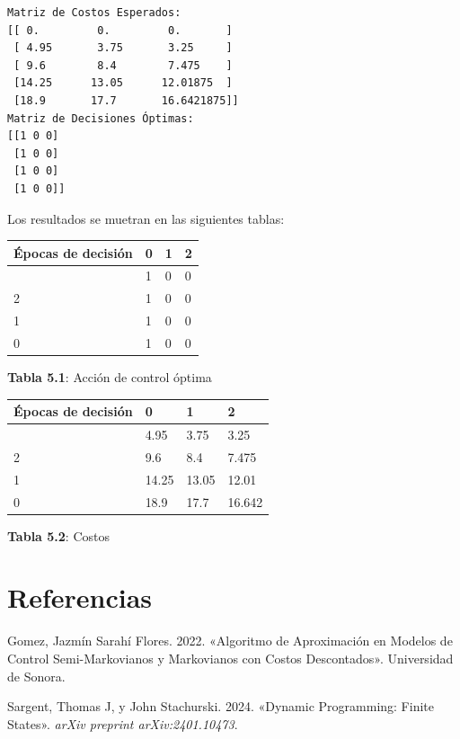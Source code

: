 \documentclass[
  us-letterpaper,
  DIV=11,
  numbers=noendperiod]{scrreprt}
\newlength{\cslhangindent}
\newenvironment{CSLReferences}[2] %
 {\begin{list}{}{%
  \setlength{\itemindent}{0pt}
  \setlength{\leftmargin}{0pt}
  \setlength{\parsep}{0pt}
  \ifodd #1
   \setlength{\leftmargin}{\cslhangindent}
   \setlength{\itemindent}{-1\cslhangindent}
  \fi
  \setlength{\itemsep}{#2\baselineskip}}}
 {\end{list}}
\begin{document}
\begin{verbatim}
Matriz de Costos Esperados:
[[ 0.         0.         0.       ]
 [ 4.95       3.75       3.25     ]
 [ 9.6        8.4        7.475    ]
 [14.25      13.05      12.01875  ]
 [18.9       17.7       16.6421875]]
Matriz de Decisiones Óptimas:
[[1 0 0]
 [1 0 0]
 [1 0 0]
 [1 0 0]]
\end{verbatim}

Los resultados se muetran en las siguientes tablas:

\begin{longtable}[]{@{}llll@{}}
\toprule\noalign{}
\textbf{Épocas de decisión} & \textbf{0} & \textbf{1} & \textbf{2} \\
\midrule\noalign{}
\endhead
\bottomrule\noalign{}
\endlastfoot
3 & 1 & 0 & 0 \\
2 & 1 & 0 & 0 \\
1 & 1 & 0 & 0 \\
0 & 1 & 0 & 0 \\
\end{longtable}

\textbf{Tabla 5.1}: Acción de control óptima

\begin{longtable}[]{@{}llll@{}}
\toprule\noalign{}
\textbf{Épocas de decisión} & \textbf{0} & \textbf{1} & \textbf{2} \\
\midrule\noalign{}
\endhead
\bottomrule\noalign{}
\endlastfoot
3 & 4.95 & 3.75 & 3.25 \\
2 & 9.6 & 8.4 & 7.475 \\
1 & 14.25 & 13.05 & 12.01 \\
0 & 18.9 & 17.7 & 16.642 \\
\end{longtable}

\textbf{Tabla 5.2}: Costos


\chapter*{Referencias}\label{referencias}


\label{refs}
\begin{CSLReferences}{1}{0}
Gomez, Jazmín Sarahí Flores. 2022. {«Algoritmo de Aproximación en
Modelos de Control Semi-Markovianos y Markovianos con Costos
Descontados»}. Universidad de Sonora.

Sargent, Thomas J, y John Stachurski. 2024. {«Dynamic Programming:
Finite States»}. \emph{arXiv preprint arXiv:2401.10473}.

\end{CSLReferences}
\end{document}
